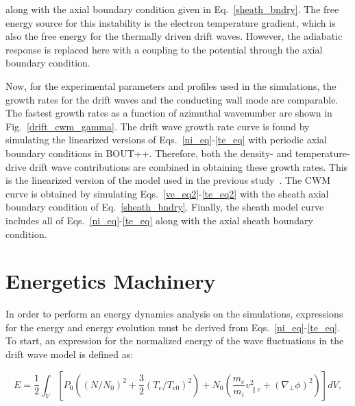 \documentclass[showpacs,preprintnumbers,amsmath,amssymb,superscriptaddress,aip]{revtex4-1}
\def\beq{\begin{equation}}
\def\eeq{\end{equation}}
\def\grad{\nabla}
\newcommand{\gradperp}{\grad_\perp}
\newcommand{\vpe}{v_{\parallel e}}
\begin{document}
along with the axial boundary condition given in Eq.~\ref{sheath_bndry}. The free energy source for this instability is the electron temperature gradient, which is also the free energy
for the thermally driven drift waves. However, the adiabatic response is replaced here with a coupling to the potential through the axial boundary condition.

Now, for the experimental parameters and profiles used in the simulations, 
the growth rates for the drift waves and the conducting wall mode are comparable. The fastest growth rates as a function of azimuthal wavenumber
are shown in Fig.~\ref{drift_cwm_gamma}.
The drift wave growth rate curve is found by simulating the linearized versions of Eqs.~\ref{ni_eq}-\ref{te_eq} with periodic axial boundary conditions in BOUT++. Therefore, both the density- and
temperature-drive drift wave contributions are combined in obtaining these growth rates. This is the linearized version of the model used in the previous study~\cite{friedman2012b}.
The CWM curve is obtained by simulating Eqs.~\ref{ve_eq2}-\ref{te_eq2} with the sheath axial boundary condition of Eq.~\ref{sheath_bndry}. 
Finally, the sheath model curve includes all of Eqs.~\ref{ni_eq}-\ref{te_eq} along with the axial sheath boundary condition.


\section{Energetics Machinery}
\label{sec_energetics_machinery}

In order to perform an energy dynamics analysis on the simulations, expressions for the energy and energy evolution must be derived from Eqs.~\ref{ni_eq}-\ref{te_eq}.
To start, an expression for the normalized energy of the wave fluctuations in the drift wave model is defined as:

\beq
\label{energy_eq}
E = \frac{1}{2} \int_V  \left[ P_0 \left((N/N_0)^2 + \frac{3}{2} (T_e/T_{e0})^2 \right) + N_0 \left( \frac{m_e}{m_i} \vpe^2 + (\gradperp \phi)^2 \right) \right] dV,
\eeq
\end{document}
